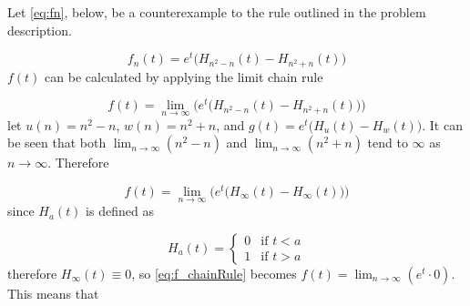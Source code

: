 \documentclass[a4paper,10pt,reqno]{amsart}
\numberwithin{equation}{section}
\newcommand{\lap}{\mathscr{L}}
\begin{document}





Let \eqref{eq:fn}, below, be a counterexample to the rule outlined in the problem description.

\begin{equation}\label{eq:fn}
     f_n(t) = e^t\big(H_{n^2 - n}(t) - H_{n^2 + n}(t)\big)
\end{equation}
\vspace{1pt}
$f(t)$ can be calculated by applying the limit chain rule

\begin{equation}
     f(t) = \lim_{n \to \infty} \bigg(e^t\big(H_{n^2 - n}(t) - H_{n^2 + n}(t)\big)\bigg)
\end{equation}
\vspace{1pt}
let $u(n) = n^2 - n$, $w(n) = n^2 + n$, and $g(t) = e^t\big(H_u(t) - H_w(t)\big)$. It can be seen that both $\lim_{n \to \infty} (n^2 - n)$ and $\lim_{n \to \infty} (n^2 + n)$ tend to  $\infty$ as $n \to \infty$. Therefore

\begin{equation}\label{eq:f_chainRule}
     f(t) = \lim_{n \to \infty} \bigg(e^t\big(H_{\infty}(t) - H_{\infty}(t)\big)\bigg)
\end{equation}
\vspace{1pt}
since $H_a(t)$ is defined as

\begin{equation}
    H_a(t) = 
     \begin{cases}
         0 & \text{if } t < a \\
         1 & \text{if } t > a
     \end{cases}
\end{equation}
\vspace{1pt}
therefore $H_{\infty}(t) \equiv 0$, so \eqref{eq:f_chainRule} becomes $f(t) = \lim_{n \to \infty} (e^t \cdot 0)$. This means that
\end{document}

